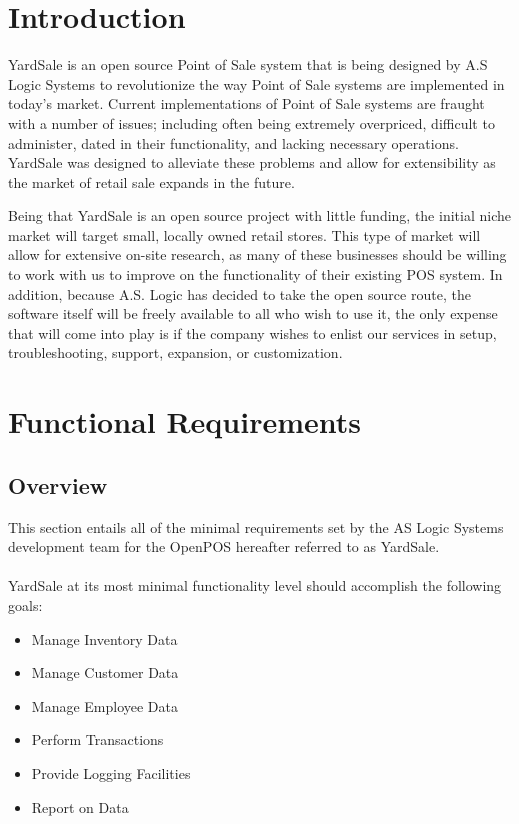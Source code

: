 \documentclass[a4paper,10pt]{article}
\title{}
\author{}
\begin{document}
\section{Introduction}

YardSale is an open source Point of Sale system that is being designed by A.S Logic Systems to revolutionize the way Point of Sale systems are implemented in today's market.  Current implementations of Point of Sale systems are fraught with a number of issues; including often being extremely overpriced, difficult to administer, dated in their functionality, and lacking necessary operations.  YardSale was designed to alleviate these problems and allow for extensibility as the market of retail sale expands in the future.

Being that YardSale is an open source project with little funding, the initial niche market will target small, locally owned retail stores.  This type of market will allow for extensive on-site research, as many of these businesses should be willing to work with us to improve on the functionality of their existing POS system.  In addition, because A.S. Logic has decided to take the open source route, the software itself will be freely available to all who wish to use it, the only expense that will come into play is if the company wishes to enlist our services in setup, troubleshooting, support, expansion, or customization.

\section{Functional Requirements}

\subsection{Overview}

This section entails all of the minimal requirements set by the AS Logic Systems development team for the OpenPOS hereafter referred to as YardSale.\\
\\
YardSale at its most minimal functionality level should accomplish the following goals:

\begin{itemize}
	\item {Manage Inventory Data}
	\item {Manage Customer Data}
	\item {Manage Employee Data}
	\item {Perform Transactions}
	\item {Provide Logging Facilities}
	\item {Report on Data}
\end{itemize}
\end{document}
